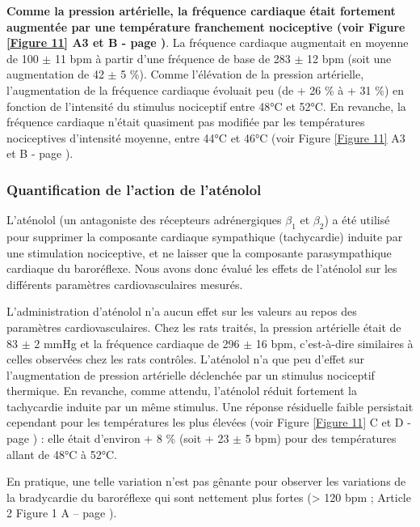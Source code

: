 \documentclass[a4paper,12pt,twoside]{report}
\begin{document}
\textbf{Comme la pression artérielle, la fréquence cardiaque était fortement augmentée par une température franchement nociceptive (voir Figure \ref{Figure 11} A3 et B - page \pageref{Figure 11})}. La fréquence cardiaque augmentait en moyenne de 100 $\pm$ 11 bpm à partir d'une fréquence de base de 283 $\pm$ 12 bpm (soit une augmentation de 42 $\pm$ 5 \%). Comme l’élévation de la pression artérielle, l'augmentation de la fréquence cardiaque évoluait peu (de + 26 \% à + 31 \%) en fonction de l'intensité du stimulus nociceptif entre 48°C et 52°C. En revanche, la fréquence cardiaque n’était quasiment pas modifiée par les températures nociceptives d'intensité moyenne, entre 44°C et 46°C (voir Figure \ref{Figure 11} A3 et B - page \pageref{Figure 11}).

\subsubsection{Quantification de l'action de l’aténolol}

L’aténolol (un antagoniste des récepteurs adrénergiques $\beta_{1}$ et $\beta_{2}$) a été utilisé pour supprimer la composante cardiaque sympathique (tachycardie) induite par une stimulation nociceptive, et ne laisser que la composante parasympathique cardiaque du baroréflexe. Nous avons donc évalué les effets de l’aténolol sur les différents paramètres cardiovasculaires mesurés.

L’administration d’aténolol n’a aucun effet sur les valeurs au repos des paramètres cardiovasculaires. Chez les rats traités, la pression artérielle était de 83 $\pm$ 2 mmHg et la fréquence cardiaque de 296 $\pm$ 16 bpm, c'est-à-dire similaires à celles observées chez les rats contrôles. L’aténolol n'a que peu d'effet sur l'augmentation de pression artérielle déclenchée par un stimulus nociceptif thermique. En revanche, comme attendu, l’aténolol réduit fortement la tachycardie induite par un même stimulus. Une réponse résiduelle faible persistait cependant pour les températures les plus élevées (voir Figure \ref{Figure 11} C et D - page \pageref{Figure 11}) : elle était d'environ + 8 \% (soit + 23 $\pm$ 5 bpm) pour des températures allant de 48°C à 52°C. 

En pratique, une telle variation n'est pas gênante pour observer les variations de la bradycardie du baroréflexe qui sont nettement plus fortes (> 120 bpm ; Article 2 Figure 1 A – page \pageref{Article2-FIG1}).
\end{document}
